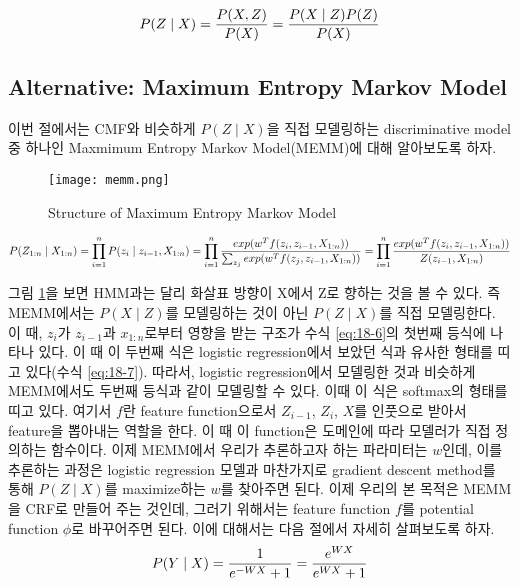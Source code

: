 \documentclass[draft=false]{oblivoir}
\begin{document}
\begin{equation}
	P(Z\mid X) = {P(X,Z) \over P(X)} = {P(X\mid Z)P(Z) \over P(X)}
\label{eq:18-5}
\end{equation}


\subsection{Alternative: Maximum Entropy Markov Model}
이번 절에서는 CMF와 비슷하게 $P(Z\mid X)$을 직접 모델링하는 discriminative model 중 하나인 Maxmimum Entropy Markov Model(MEMM)에 대해 알아보도록 하자. 

\begin{figure}[ht] \centering 
  \texttt{[image: memm.png]}
  \caption{Structure of Maximum Entropy Markov Model}
  \label{fig:18-7}
\end{figure}
\begin{equation}
	P(Z_{1:n}\mid X_{1:n}) = \prod_{i=1}^n {P(z_i\mid z_{i-1},X_{1:n}}) =  \prod_{i=1}^n {exp(w^T f(z_i,z_{i-1},X_{1:n})) \over \sum_{z_j} {exp(w^T f(z_j,z_{i-1},X_{1:n}))}} = \prod_{i=1}^n {exp(w^T f(z_i,z_{i-1},X_{1:n})) \over Z(z_{i-1}, X_{1:n})}
\label{eq:18-6}
\end{equation}

그림 \ref{fig:18-7}을 보면 HMM과는 달리 화살표 방향이 X에서 Z로 향하는 것을 볼 수 있다. 즉 MEMM에서는 $P(X\mid Z)$를 모델링하는 것이 아닌 $P(Z\mid X)$를 직접 모델링한다. 이 때, $z_i$가 $z_{i-1}$과 $x_{1:n}$로부터 영향을 받는 구조가 수식 \ref{eq:18-6}의 첫번째 등식에 나타나 있다. 이 때 이 두번째 식은 logistic regression에서 보았던 식과 유사한 형태를 띠고 있다(수식 \ref{eq:18-7}). 따라서, logistic regression에서 모델링한 것과 비슷하게 MEMM에서도 두번째 등식과 같이 모델링할 수 있다. 이때 이 식은 softmax의 형태를 띠고 있다. 여기서 $f$란 feature function으로서 $Z_{i-1}$, $Z_i$, $X$를 인풋으로 받아서 feature을 뽑아내는 역할을 한다. 이 때 이 function은 도메인에 따라 모델러가 직접 정의하는 함수이다. 이제 MEMM에서 우리가 추론하고자 하는 파라미터는 $w$인데, 이를 추론하는 과정은 logistic regression 모델과 마찬가지로 gradient descent method를 통해 $P(Z\mid X)$를 maximize하는 $w$를 찾아주면 된다. 이제 우리의 본 목적은 MEMM을 CRF로 만들어 주는 것인데, 그러기 위해서는 feature function $f$를 potential function $\phi$로 바꾸어주면 된다. 이에 대해서는 다음 절에서 자세히 살펴보도록 하자. 
\begin{equation}
	P(Y\mid X) = {1 \over e^{-W X}+1} = {e^{W X} \over e^{W X }+1}
\label{eq:18-7}
\end{equation}
\end{document}
